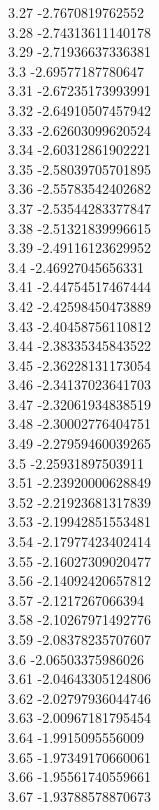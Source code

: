 {3.27	-2.7670819762552\\
3.28	-2.74313611140178\\
3.29	-2.71936637336381\\
3.3	-2.69577187780647\\
3.31	-2.67235173993991\\
3.32	-2.64910507457942\\
3.33	-2.62603099620524\\
3.34	-2.60312861902221\\
3.35	-2.58039705701895\\
3.36	-2.55783542402682\\
3.37	-2.53544283377847\\
3.38	-2.51321839996615\\
3.39	-2.49116123629952\\
3.4	-2.46927045656331\\
3.41	-2.44754517467444\\
3.42	-2.42598450473889\\
3.43	-2.40458756110812\\
3.44	-2.38335345843522\\
3.45	-2.36228131173054\\
3.46	-2.34137023641703\\
3.47	-2.32061934838519\\
3.48	-2.30002776404751\\
3.49	-2.27959460039265\\
3.5	-2.25931897503911\\
3.51	-2.23920000628849\\
3.52	-2.21923681317839\\
3.53	-2.19942851553481\\
3.54	-2.17977423402414\\
3.55	-2.16027309020477\\
3.56	-2.14092420657812\\
3.57	-2.1217267066394\\
3.58	-2.10267971492776\\
3.59	-2.08378235707607\\
3.6	-2.06503375986026\\
3.61	-2.04643305124806\\
3.62	-2.02797936044746\\
3.63	-2.00967181795454\\
3.64	-1.9915095556009\\
3.65	-1.97349170660061\\
3.66	-1.95561740559661\\
3.67	-1.93788578870673\\
}
